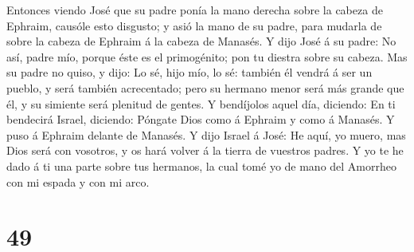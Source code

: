 Entonces viendo José que su padre ponía la mano derecha sobre la cabeza
de Ephraim, causóle esto disgusto; y asió la mano de su padre, para
mudarla de sobre la cabeza de Ephraim á la cabeza de Manasés.
 Y dijo José á su padre: No así, padre mío, porque éste es
el primogénito; pon tu diestra sobre su cabeza.  Mas su
padre no quiso, y dijo: Lo sé, hijo mío, lo sé: también él vendrá á ser
un pueblo, y será también acrecentado; pero su hermano menor será más
grande que él, y su simiente será plenitud de gentes.  Y
bendíjolos aquel día, diciendo: En ti bendecirá Israel, diciendo:
Póngate Dios como á Ephraim y como á Manasés. Y puso á Ephraim delante
de Manasés.  Y dijo Israel á José: He aquí, yo muero, mas
Dios será con vosotros, y os hará volver á la tierra de vuestros padres.
 Y yo te he dado á ti una parte sobre tus hermanos, la cual
tomé yo de mano del Amorrheo con mi espada y con mi arco.

\hypertarget{section-48}{%
\section{49}\label{section-48}}

